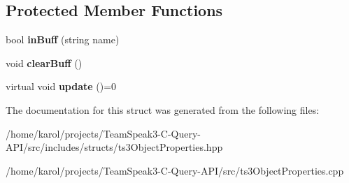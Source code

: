 \subsection*{Protected Member Functions}
\begin{DoxyCompactItemize}
\item 
bool {\bfseries in\+Buff} (string name)\hypertarget{struct_ts3_api_1_1ts3_object_properties_a65236aa2fec0af870801637701718244}{}\label{struct_ts3_api_1_1ts3_object_properties_a65236aa2fec0af870801637701718244}

\item 
void {\bfseries clear\+Buff} ()\hypertarget{struct_ts3_api_1_1ts3_object_properties_ac9deae104a2f46f95a35482c90420dfb}{}\label{struct_ts3_api_1_1ts3_object_properties_ac9deae104a2f46f95a35482c90420dfb}

\item 
virtual void {\bfseries update} ()=0\hypertarget{struct_ts3_api_1_1ts3_object_properties_a83202a6c42ecdb30c89ce6240f25d69b}{}\label{struct_ts3_api_1_1ts3_object_properties_a83202a6c42ecdb30c89ce6240f25d69b}

\end{DoxyCompactItemize}


The documentation for this struct was generated from the following files\+:\begin{DoxyCompactItemize}
\item 
/home/karol/projects/\+Team\+Speak3-\/\+C-\/\+Query-\/\+A\+P\+I/src/includes/structs/ts3\+Object\+Properties.\+hpp\item 
/home/karol/projects/\+Team\+Speak3-\/\+C-\/\+Query-\/\+A\+P\+I/src/ts3\+Object\+Properties.\+cpp\end{DoxyCompactItemize}
